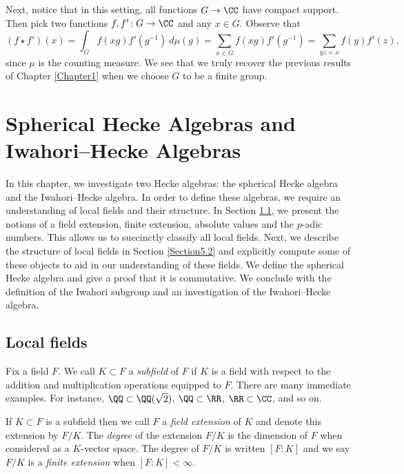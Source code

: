 \documentclass[11pt]{amsart}
\theoremstyle{remark}
\begin{document}
Next, notice that in this setting, all functions $G\to\CC$ have compact support.
Then pick two functions $f,f'\colon G\to\CC$ and any $x\in G$.
Observe that
\[
	(f\star f')(x) = \int_G f(xg)f'(g^{-1})\ d\mu(g) = \sum_{x\in G} f(xg)f'(g^{-1}) = \sum_{yz = x} f(y)f'(z),
\]
since $\mu$ is the counting measure.
We see that we truly recover the previous results of Chapter \ref{Chapter1} when we choose $G$ to be a finite group.


\newpage
\section{Spherical Hecke Algebras and Iwahori--Hecke Algebras}\label{Chapter5}
In this chapter, we investigate two Hecke algebras: the spherical Hecke algebra and the Iwahori--Hecke algebra.
In order to define these algebras, we require an understanding of local fields and their structure.
In Section \ref{Section5.1}, we present the notions of a field extension, finite extension, absolute values and the $p$-adic numbers.
This allows us to succinctly classify all local fields.
Next, we describe the structure of local fields in Section \ref{Section5.2} and explicitly compute some of these objects to aid in our understanding of these fields.
We define the spherical Hecke algebra and give a proof that it is commutative.
We conclude with the definition of the Iwahori subgroup and an investigation of the Iwahori--Hecke algebra.


\subsection{Local fields}\label{Section5.1}
Fix a field $F$.
We call $K\subset F$ a \emph{subfield} of $F$ if $K$ is a field with respect to the addition and multiplication operations equipped to $F$.
There are many immediate examples.
For instance, $\QQ\subset\QQ(\sqrt{2})$, $\QQ\subset\RR$, $\RR\subset\CC$, and so on.

If $K\subset F$ is a subfield then we call $F$ a \emph{field extension} of $K$ and denote this extension by $F/K$.
The \emph{degree} of the extension $F/K$ is the dimension of $F$ when considered as a $K$-vector space.
The degree of $F/K$ is written $[F:K]$ and we say $F/K$ is a \emph{finite extension} when $[F:K]<\infty$.
\end{document}
